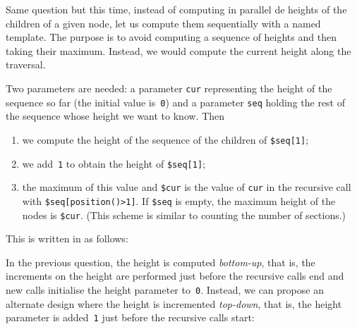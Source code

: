 Same question but this time, instead of computing in parallel de
heights of the children of a given node, let us compute them
sequentially with a named template. The purpose is to avoid computing
a sequence of heights and then taking their maximum. Instead, we would
compute the current height along the traversal.

Two parameters are needed: a parameter \texttt{cur} representing the
height of the sequence so far (the initial value is~\texttt{0}) and a
parameter \texttt{seq} holding the rest of the sequence whose height
we want to know. Then
\begin{enumerate}

  \item we compute the height of the sequence of the children of
    \texttt{\$seq[1]};

  \item we add~\texttt{1} to obtain the height of \texttt{\$seq[1]};

  \item the maximum of this value and \texttt{\$cur} is the value of
    \texttt{cur} in the recursive call with
    \texttt{\$seq[position()>1]}. If \texttt{\$seq} is empty, the
    maximum height of the nodes is \texttt{\$cur}. (This scheme is
    similar to counting the number of sections.)

\end{enumerate}
\noindent This is written in \XSLT as follows:

In the previous question, the height is computed
\emph{bottom\hyp{}up}, that is, the increments on the height are
performed just before the recursive calls end and new calls initialise
the height parameter to~\texttt{0}. Instead, we can propose an
alternate design where the height is incremented \emph{top\hyp{}down},
that is, the height parameter is added~\texttt{1} just before the
recursive calls start:


